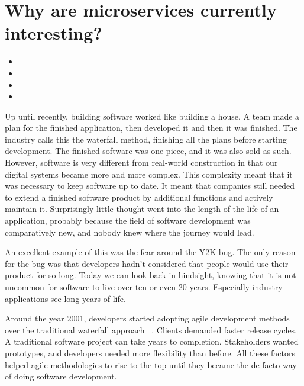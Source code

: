 \section{Why are microservices currently interesting?}

\begin{itemize}
  \item {}
  \item {}
  \item {}
  \item {}
\end{itemize}

Up until recently, building software worked like building a house. A team made a plan for the finished application, then developed it and then it was finished. The industry calls this the waterfall method, finishing all the plans before starting development. The finished software was one piece, and it was also sold as such. However, software is very different from real-world construction in that our digital systems became more and more complex. This complexity meant that it was necessary to keep software up to date. It meant that companies still needed to extend a finished software product by additional functions and actively maintain it. Surprisingly little thought went into the length of the life of an application, probably because the field of software development was comparatively new, and nobody knew where the journey would lead.

An excellent example of this was the fear around the Y2K bug. The only reason for the bug was that developers hadn't considered that people would use their product for so long. Today we can look back in hindsight, knowing that it is not uncommon for software to live over ten or even 20 years. Especially industry applications see long years of life.

Around the year 2001, developers started adopting agile development methods over the traditional waterfall approach ~\cite{agile.2020}. Clients demanded faster release cycles. A traditional software project can take years to completion. Stakeholders wanted prototypes, and developers needed more flexibility than before. All these factors helped agile methodologies to rise to the top until they became the de-facto way of doing software development.

